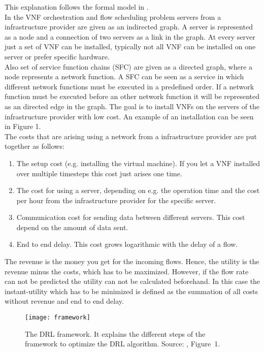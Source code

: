 This explanation follows the formal model in \cite{Gu}.\\
In the VNF orchestration and flow scheduling problem servers from a infrastructure provider are given as an indirected graph. A server is represented as a node and a connection of two servers as a link in the graph.  At every server just a set of VNF can be installed, typically not all VNF can be installed on one server or prefer specific hardware.\\
 Also set of service function chains (SFC) are given as a directed graph, where a node represents a network function. A SFC can be seen as a service in which different network functions must be executed in a predefined order. If a network function must be executed before an other network function it will be represented as an directed edge in the graph. The goal is to install VNFs on the servers of the infrastructure provider with low cost. An example of an installation can be seen in Figure 1.\\%


The costs that are arising using a network from a infrastructure provider are put together as follows:
\begin{enumerate}
\item The setup cost (e.g. installing the virtual machine). If you let a VNF installed over multiple timesteps this cost just arises one time.
\item The cost for using a server, depending on e.g. the operation time and the cost per hour from the infrastructure provider for the specific server.

\item Communication cost for sending data between different servers. This cost depend on the amount of data sent.
\item End to end delay. This cost grows logarithmic with the delay of a flow.
\end{enumerate}
The revenue is the money you get for the incoming flows. Hence, the utility is the revenue minus the costs, which has to be maximized. However, if the flow rate can not be predicted the utility can not be calculated beforehand. In this case the instant-utility which has to be minimized is defined as the summation of all costs without revenue and end to end delay.


\begin{figure*}[t]
\label{fig:framework}
\centering
\texttt{[image: framework]}
\caption{The DRL framework. It explains the different steps of the framework to optimize the DRL algorithm. Source: \cite{Gu}, Figure~1.}
\end{figure*}
